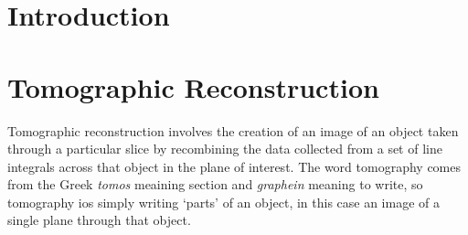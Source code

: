 
\section{Introduction} %
	\label{sec:introduction}


\section{Tomographic Reconstruction} %
	\label{sec:tomographic_reconstruction}
	Tomographic reconstruction involves the creation of an image of an object taken through a particular slice by recombining the data collected from a set of line integrals across that object in the plane of interest. The word tomography comes from the Greek \textit{tomos} meaining section and \textit{graphein} meaning to write, so tomography ios simply writing `parts' of an object, in this case an image of a single plane through that object.

